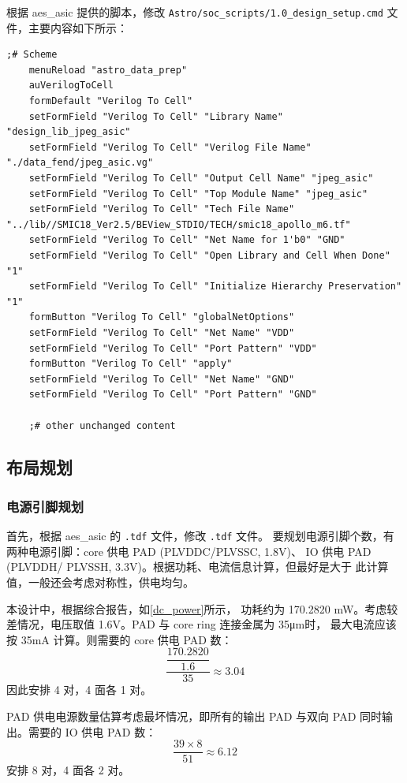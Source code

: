 \documentclass[12pt,hyperref,a4paper,UTF8]{ctexart}
\begin{document}
根据 aes\_asic 提供的脚本，修改 \texttt{Astro/soc\_scripts/1.0\_design\_setup.cmd}
文件，主要内容如下所示：
\begin{lstlisting}[style=tclstyle,name=1.0_design_setup.cmd]
    ;# Scheme
    menuReload "astro_data_prep"
    auVerilogToCell
    formDefault "Verilog To Cell"
    setFormField "Verilog To Cell" "Library Name" "design_lib_jpeg_asic"
    setFormField "Verilog To Cell" "Verilog File Name" "./data_fend/jpeg_asic.vg"
    setFormField "Verilog To Cell" "Output Cell Name" "jpeg_asic"
    setFormField "Verilog To Cell" "Top Module Name" "jpeg_asic"
    setFormField "Verilog To Cell" "Tech File Name" "../lib//SMIC18_Ver2.5/BEView_STDIO/TECH/smic18_apollo_m6.tf"
    setFormField "Verilog To Cell" "Net Name for 1'b0" "GND"
    setFormField "Verilog To Cell" "Open Library and Cell When Done" "1"
    setFormField "Verilog To Cell" "Initialize Hierarchy Preservation" "1"
    formButton "Verilog To Cell" "globalNetOptions"
    setFormField "Verilog To Cell" "Net Name" "VDD"
    setFormField "Verilog To Cell" "Port Pattern" "VDD"
    formButton "Verilog To Cell" "apply"
    setFormField "Verilog To Cell" "Net Name" "GND"
    setFormField "Verilog To Cell" "Port Pattern" "GND"

    ;# other unchanged content
\end{lstlisting}

\subsection{布局规划}
\subsubsection{电源引脚规划}
首先，根据 aes\_asic 的 \texttt{.tdf} 文件，修改 \texttt{.tdf} 文件。
要规划电源引脚个数，有两种电源引脚：core 供电 PAD (PLVDDC/PLVSSC, 1.8\unit{\V})、
IO 供电 PAD (PLVDDH/
PLVSSH, 3.3\unit{\V})。根据功耗、电流信息计算，但最好是大于
此计算值，一般还会考虑对称性，供电均匀。

本设计中，根据综合报告，如\autoref{dc_power}所示，
功耗约为 170.2820 \unit{\mW}。考虑较差情况，电压取值 1.6\unit{\V}。PAD 与 
core ring 连接金属为 35\unit{\um}时，
最大电流应该按 35\unit{\mA} 计算。则需要的 core 供电 PAD 数：
\begin{equation}
    \dfrac{\dfrac{170.2820}{1.6}}{35} \approx 3.04 
\end{equation}
因此安排 4 对，4 面各 1 对。

PAD 供电电源数量估算考虑最坏情况，即所有的输出 PAD 与双向 PAD 同时输出。需要的 IO 供电 PAD 数：
\begin{equation}
    \dfrac{39 \times 8}{51} \approx 6.12
\end{equation}
安排 8 对，4 面各 2 对。
\end{document}
